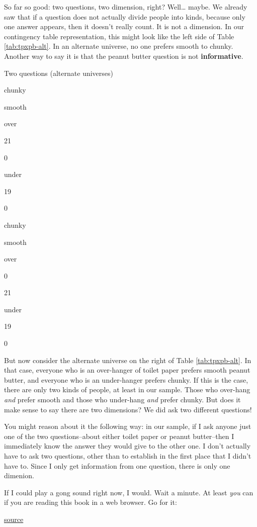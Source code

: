 \documentclass[]{book}
\begin{document}
So far so good: two questions, two dimension, right? Well\ldots{} maybe. We already saw that if a question does not actually divide people into kinds, because only one answer appears, then it doesn't really count. It is not a dimension. In our contingency table representation, this might look like the left side of Table \ref{tab:tpxpb-alt}. In an alternate universe, no one prefers smooth to chunky. Another way to say it is that the peanut butter question is not \textbf{informative}.

\label{tab:tpxpb-alt}Two questions (alternate universes)

chunky

smooth

over

21

0

under

19

0

chunky

smooth

over

0

21

under

19

0

But now consider the alternate universe on the right of Table \ref{tab:tpxpb-alt}. In that case, everyone who is an over-hanger of toilet paper prefers smooth peanut butter, and everyone who is an under-hanger prefers chunky. If this is the case, there are only two kinds of people, at least in our sample. Those who over-hang \emph{and} prefer smooth and those who under-hang \emph{and} prefer chunky. But does it make sense to say there are two dimensions? We did ask two different questions!

You might reason about it the following way: in our sample, if I ask anyone just one of the two questions--about either toilet paper or peanut butter--then I immediately know the answer they would give to the other one. I don't actually have to ask two questions, other than to establish in the first place that I didn't have to. Since I only get information from one question, there is only one dimenion.

If I could play a gong sound right now, I would. Wait a minute. At least \emph{you} can if you are reading this book in a web browser. Go for it:

\href{http://soundbible.com/2148-Chinese-Gong.html}{source}
\end{document}
